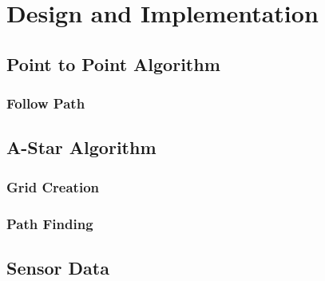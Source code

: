 \section{Design and Implementation}

\subsection{Point to Point Algorithm}

\subsubsection{Follow Path}

\subsection{A-Star Algorithm}

\subsubsection{Grid Creation}

\subsubsection{Path Finding}

\subsection{Sensor Data}